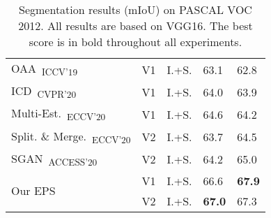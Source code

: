 \begin{table}[]
{\begin{tabular}{@{}lccll@{}}
\multicolumn{1}{l}{OAA~\cite{jiang2019integral}\textsubscript{ICCV'19}}                 & V1        & I.+S. & 63.1                    & 62.8                     \\
\multicolumn{1}{l}{ICD~\cite{fan2020learning}\textsubscript{CVPR'20}}                   & V1        & I.+S. & 64.0                    & 63.9                     \\
\multicolumn{1}{l}{Multi-Est.~\cite{fan2020employing}\textsubscript{ECCV'20}}           & V1        & I.+S. & 64.6                    & 64.2                     \\
\multicolumn{1}{l}{Split. \& Merge.~\cite{zhang2020splitting}\textsubscript{ECCV'20}}   & V2        & I.+S. & 63.7                    & 64.5                     \\
\multicolumn{1}{l}{SGAN~\cite{yao2020saliency}\textsubscript{ACCESS'20}}                & V2        & I.+S. & 64.2                    & 65.0                     \\ \midrule
\multicolumn{1}{l}{\multirow{2}{*}{Our EPS}}                                            & V1        & I.+S. & 66.6                    & \textbf{67.9}            \\
\multicolumn{1}{l}{}                                                                    & V2        & I.+S. & \textbf{67.0}           & 67.3                     \\ \bottomrule

\end{tabular}
}
\vspace{2mm}
\caption{Segmentation results (mIoU) on PASCAL VOC 2012. All results are based on VGG16. The best score is in bold throughout all experiments.}\vspace{-3mm}
\label{tab:seg_quan_voc_vgg16}
\end{table}